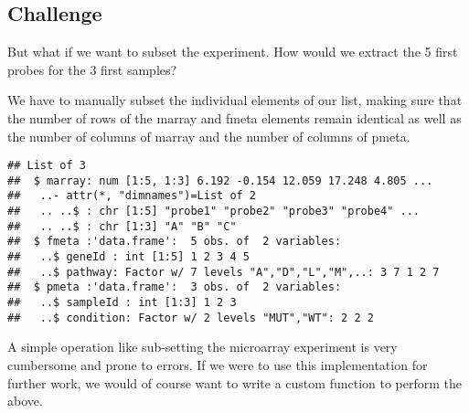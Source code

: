 \documentclass[]{article}
\newenvironment{Shaded}{\begin{snugshade}}{\end{snugshade}}
\newcommand{\DataTypeTok}[1]{\textcolor[rgb]{0.13,0.29,0.53}{#1}}
\newcommand{\DecValTok}[1]{\textcolor[rgb]{0.00,0.00,0.81}{#1}}
\newcommand{\KeywordTok}[1]{\textcolor[rgb]{0.13,0.29,0.53}{\textbf{#1}}}
\newcommand{\NormalTok}[1]{#1}
\newcommand{\OperatorTok}[1]{\textcolor[rgb]{0.81,0.36,0.00}{\textbf{#1}}}
\newcommand{\StringTok}[1]{\textcolor[rgb]{0.31,0.60,0.02}{#1}}
\begin{document}
\hypertarget{challenge}{%
\subsection{Challenge}\label{challenge}}

But what if we want to subset the experiment. How would we extract the 5
ﬁrst probes for the 3 ﬁrst samples?

We have to manually subset the individual elements of our list, making
sure that the number of rows of the marray and fmeta elements remain
identical as well as the number of columns of marray and the number of
columns of pmeta.

\begin{Shaded}
\end{Shaded}

\begin{verbatim}
## List of 3
##  $ marray: num [1:5, 1:3] 6.192 -0.154 12.059 17.248 4.805 ...
##   ..- attr(*, "dimnames")=List of 2
##   .. ..$ : chr [1:5] "probe1" "probe2" "probe3" "probe4" ...
##   .. ..$ : chr [1:3] "A" "B" "C"
##  $ fmeta :'data.frame':  5 obs. of  2 variables:
##   ..$ geneId : int [1:5] 1 2 3 4 5
##   ..$ pathway: Factor w/ 7 levels "A","D","L","M",..: 3 7 1 2 7
##  $ pmeta :'data.frame':  3 obs. of  2 variables:
##   ..$ sampleId : int [1:3] 1 2 3
##   ..$ condition: Factor w/ 2 levels "MUT","WT": 2 2 2
\end{verbatim}

A simple operation like sub-setting the microarray experiment is very
cumbersome and prone to errors. If we were to use this implementation
for further work, we would of course want to write a custom function to
perform the above.
\end{document}
